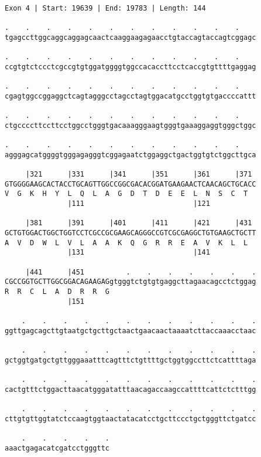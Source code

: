 \documentclass{article}
\begin{document}
\begin{Verbatim}
Exon 4 | Start: 19639 | End: 19783 | Length: 144
 
.    .    .    .    .    .    .    .    .    .    .    .    
tgagccttggcaggcaggagcaactcaaggaagagaacctgtaccagtaccagtcggagc
  
.    .    .    .    .    .    .    .    .    .    .    .    
ccgtgtctccctcgccgtgtggatggggtggccacaccttcctcaccgtgttttgaggag
  
.    .    .    .    .    .    .    .    .    .    .    .    
cgagtggccggaggctcagtagggcctagcctagtggacatgcctggtgtgaccccattt
  
.    .    .    .    .    .    .    .    .    .    .    .    
ctgccccttccttcctggcctgggtgacaaagggaagtgggtgaaaggaggtgggctggc
  
.    .    .    .    .    .    .    .    .    .    .    .    
agggagcatggggtgggagagggtcggagaatctggaggctgactggtgtctggcttgca
  
     |321      |331      |341      |351      |361      |371 
GTGGGGAAGCACTACCTGCAGTTGGCCGGCGACACGGATGAAGAACTCAACAGCTGCACC
V  G  K  H  Y  L  Q  L  A  G  D  T  D  E  E  L  N  S  C  T  
               |111                          |121           
  
     |381      |391      |401      |411      |421      |431 
GCTGTGGACTGGCTGGTCCTCGCCGCGAAGCAGGGCCGTCGCGAGGCTGTGAAGCTGCTT
A  V  D  W  L  V  L  A  A  K  Q  G  R  R  E  A  V  K  L  L  
               |131                          |141           
  
     |441      |451          .    .    .    .    .    .    .
CGCCGGTGCTTGGCGGACAGAAGAGgtgggtctgtgtgaggcttagaacagcctctggag
R  R  C  L  A  D  R  R  G                                   
               |151                                         
  
    .    .    .    .    .    .    .    .    .    .    .    .
ggttgagcagcttgtaatgctgcttgctaactgaacaactaaaatcttaccaaacctaac
  
    .    .    .    .    .    .    .    .    .    .    .    .
gctggtgatgctgttgggaaatttcagtttctgttttgctggtggccttctcattttaga
  
    .    .    .    .    .    .    .    .    .    .    .    .
cactgtttctggacttaacatgggatatttaacagaccaagccattttcattctctttgg
  
    .    .    .    .    .    .    .    .    .    .    .    .
cttgtgttggtatctccaagtggtaactatacatcctgcttccctgctgggttctgatcc
  
    .    .    .    .    .
aaactgagacatcgatcctgggttc
\end{Verbatim}
\end{document}
